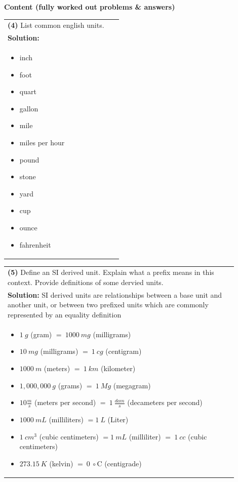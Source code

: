 \documentclass{article}
\begin{document}
\noindent
{\large \textbf{Content (fully worked out problems \& answers)}} \\[0.2em]

\begin{tabular}{|p{0.9\linewidth}|}
\hline
\textbf{(4)} List common english units. \\
\textbf{Solution:} \\
\begin{itemize}
    \item inch
    \item foot
    \item quart
    \item gallon
    \item mile
    \item miles per hour
    \item pound
    \item stone
    \item yard
    \item cup
    \item ounce
    \item fahrenheit
\end{itemize} \\
\hline
\end{tabular}



\begin{tabular}{|p{0.9\linewidth}|}
\hline
\textbf{(5)} Define an SI derived unit. Explain what a prefix means in this context. Provide definitions of some dervied units. \\
\textbf{Solution:} SI derived units are relationships between a base unit and another unit, or between two prefixed units which are commonly represented by an equality definition \\
\begin{itemize}
    \item $1~g$ (gram) $=~1000~mg$ (milligrams)
    \item $10~mg$ (milligrams) $=~1~cg$ (centigram)
    \item $1000~m$ (meters) $=~1~km$ (kilometer)
    \item $1,000,000~g$ (grams) $=~1~Mg$ (megagram)
    \item $10 \frac{m}{s}$ (meters per second) $=~1~\frac{dam}{s}$ (decameters per second)
    \item $1000~mL$ (milliliters) $= 1~L$ (Liter)
    \item $1~cm^3$ (cubic centimeters) $= 1~mL$ (milliliter) $=~1~cc$ (cubic centimeters)
    \item $ 273.15~K$ (kelvin) $=~0~\circ\mathrm{C}$ (centigrade)
\end{itemize} \\
\hline
\end{tabular}
\end{document}
